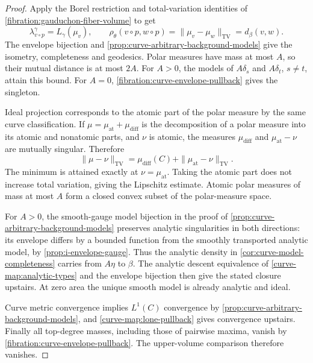 \begin{proof}
Apply the Borel restriction and
total-variation identities of
\cref{fibration:gauduchon-fiber-volume} to get
\[
 \lambda_{v\circ p}^\gamma=L_\gamma(\mu_v),\qquad
 \rho_\theta(v\circ p,w\circ p)
       =\|\mu_v-\mu_w\|_{\mathrm{TV}}=d_\beta(v,w).
\]
The envelope bijection and
\cref{prop:curve-arbitrary-background-models} give the isometry,
completeness and geodesics. Polar measures have mass at most
$A$, so their mutual distance is at most $2A$. For $A>0$, the
models of $A\delta_s$ and $A\delta_t$, $s\ne t$, attain this
bound. For $A=0$, \cref{fibration:curve-envelope-pullback} gives
the singleton.

Ideal projection corresponds to the atomic part of the polar
measure by the same curve classification. If
$\mu=\mu_{\mathrm{at}}+\mu_{\mathrm{diff}}$ is the decomposition of a
polar measure into its atomic and nonatomic parts, and $\nu$ is atomic,
the measures $\mu_{\mathrm{diff}}$ and
$\mu_{\mathrm{at}}-\nu$ are mutually singular. Therefore
\[
 \|\mu-\nu\|_{\mathrm{TV}}
  =\mu_{\mathrm{diff}}(C)
     +\|\mu_{\mathrm{at}}-\nu\|_{\mathrm{TV}}.
\]
The minimum is attained exactly at $\nu=\mu_{\mathrm{at}}$.
Taking the atomic part does not increase total variation, giving
the Lipschitz estimate. Atomic polar measures of mass at most
$A$ form a closed convex subset of the polar-measure space.

For $A>0$, the smooth-gauge model bijection in the proof of
\cref{prop:curve-arbitrary-background-models} preserves analytic
singularities in both directions: its envelope differs by a
bounded function from the smoothly transported analytic model,
by \cref{prop:i-envelope-gauge}. Thus the analytic density in
\cref{cor:curve-model-completeness} carries from $A\eta$ to
$\beta$. The analytic descent equivalence of
\cref{curve-map:analytic-types} and the envelope bijection then
give the stated closure upstairs. At zero area the unique smooth
model is already analytic and ideal.

Curve metric convergence implies $L^1(C)$ convergence by
\cref{prop:curve-arbitrary-background-models}, and
\cref{curve-map:lone-pullback} gives convergence upstairs.
Finally all top-degree masses, including those of pairwise
maxima, vanish by \cref{fibration:curve-envelope-pullback}.
The upper-volume comparison therefore vanishes.
\end{proof}

